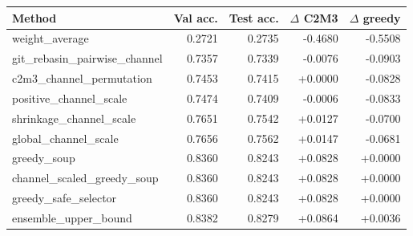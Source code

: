 \begin{tabular}{lrrrr}
\toprule
Method & Val acc. & Test acc. & $\Delta$ C2M3 & $\Delta$ greedy \\
\midrule
weight\_average & 0.2721 & 0.2735 & -0.4680 & -0.5508 \\
git\_rebasin\_pairwise\_channel & 0.7357 & 0.7339 & -0.0076 & -0.0903 \\
c2m3\_channel\_permutation & 0.7453 & 0.7415 & +0.0000 & -0.0828 \\
positive\_channel\_scale & 0.7474 & 0.7409 & -0.0006 & -0.0833 \\
shrinkage\_channel\_scale & 0.7651 & 0.7542 & +0.0127 & -0.0700 \\
global\_channel\_scale & 0.7656 & 0.7562 & +0.0147 & -0.0681 \\
greedy\_soup & 0.8360 & 0.8243 & +0.0828 & +0.0000 \\
channel\_scaled\_greedy\_soup & 0.8360 & 0.8243 & +0.0828 & +0.0000 \\
greedy\_safe\_selector & 0.8360 & 0.8243 & +0.0828 & +0.0000 \\
ensemble\_upper\_bound & 0.8382 & 0.8279 & +0.0864 & +0.0036 \\
\bottomrule
\end{tabular}
